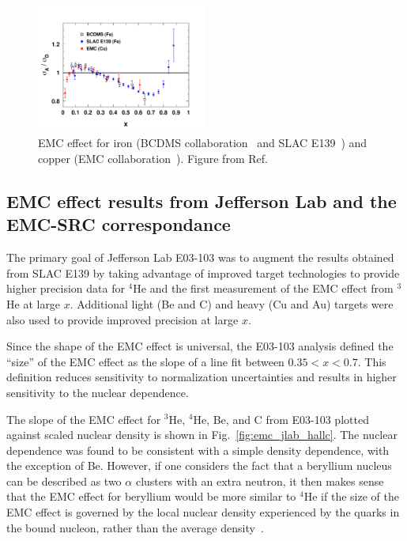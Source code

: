\begin{figure}[htb]
  \includegraphics[width=0.5\textwidth]{plots/emc_cu_fe.pdf}
  \caption{EMC effect for iron (BCDMS collaboration~\cite{Benvenuti:1987az} and SLAC E139~\cite{Gomez:1993ri})
    and copper (EMC collaboration~\cite{Ashman:1992kv}).
    Figure from Ref.~\cite{Guzey:2012yk}}
  \label{fig:emc_iron}
\end{figure}

\subsection{EMC effect results from Jefferson Lab and the EMC-SRC correspondance}

The primary goal of Jefferson Lab E03-103 was to augment the results obtained from SLAC E139 by taking
advantage of improved target technologies to provide higher precision data for $^4$He and the first
measurement of the EMC effect from $^3$He at large $x$.  Additional light (Be and C) and heavy (Cu and Au)
targets were also used to provide improved precision at large $x$.

Since the shape of the EMC effect is universal, the E03-103 analysis defined the ``size'' of the EMC
effect as the slope of a line fit between $0.35<x<0.7$.  This definition reduces sensitivity to
normalization uncertainties and results in higher sensitivity to the nuclear dependence.

The slope of the EMC effect for $^3$He, $^4$He, Be, and C from E03-103 plotted against scaled nuclear
density is shown in Fig.~\ref{fig:emc_jlab_hallc}.  The nuclear dependence was found to be consistent
with a simple density dependence, with the exception of Be. However, if one considers the fact that a
beryllium nucleus can be described as two $\alpha$ clusters with an extra neutron, it then makes sense
that the EMC effect for beryllium would be more similar to $^4$He if the size of the EMC effect is
governed by the local nuclear density experienced by the quarks in the bound nucleon, rather than the
average density~\cite{Seely:2009gt}.

